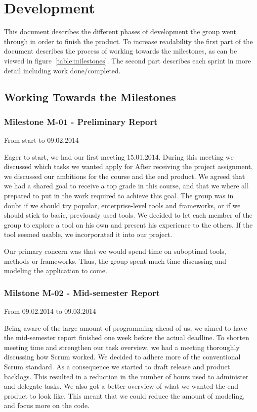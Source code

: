 \chapter{Development}

This document describes the different phases of development the group
went through in order to finish the product. To increase readability
the first part of the document describes the process of working towards the
milestones, as can be viewed in figure~\ref{table:milestones}. The second part
describes each sprint in more detail including work done/completed. 

\section{Working Towards the Milestones}
\subsection{Milestone M-01 - Preliminary Report}
\label{sec:M01}

From start to 09.02.2014

Eager to start, we had our first meeting 15.01.2014. During this meeting we
discussed which tasks we wanted apply for After receiving the project
assignment, we discussed our ambitions for the course and the end product. We
agreed that we had a shared goal to receive a top grade in this course, and
that we where all prepared to put in the work required to achieve this goal.
The group was in doubt if we should try popular, enterprise-level tools and
frameworks, or if we should stick to basic, previously used tools. We decided
to let each member of the group to explore a tool on his own and present his
experience to the others. If the tool seemed usable, we incorporated it into
our project.

Our primary concern was that we would spend time on suboptimal tools, methods
or frameworks. Thus, the group spent much time discussing and modeling the
application to come. 

\subsection{Milstone M-02 - Mid-semester Report}
\label{sec:M02}
From 09.02.2014 to 09.03.2014

Being aware of the large amount of programming ahead of us, we aimed to have
the mid-semester report finished one week before the actual deadline. To
shorten meeting time and strengthen our task overview, we had a meeting
thoroughly discussing how Scrum worked. We decided to adhere more of the
conventional Scrum standard. As a consequence we started to draft release and
product backlogs. This resulted in a reduction in the number of hours used to
administer and delegate tasks. We also got a better overview of what we wanted
the end product to look like. This meant that we could reduce the amount of
modeling, and focus more on the code. 

